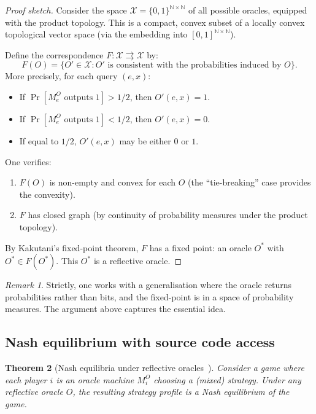 \documentclass[11pt,a4paper]{article}
\newtheorem{theorem}{Theorem}[section]
\theoremstyle{definition}
\theoremstyle{remark}
\newtheorem{remark}[theorem]{Remark}
\newcommand{\N}{\mathbb{N}}
\begin{document}
\begin{proof}[Proof sketch]
Consider the space $\mathcal{X} = \{0,1\}^{\N \times \N}$ of all
possible oracles, equipped with the product topology.  This is a
compact, convex subset of a locally convex topological vector space
(via the embedding into $[0,1]^{\N \times \N}$).

Define the correspondence $F : \mathcal{X} \rightrightarrows \mathcal{X}$
by:
\[
  F(O) = \bigl\{ O' \in \mathcal{X} : O' \text{ is consistent with the
  probabilities induced by } O \bigr\}.
\]
More precisely, for each query $(e, x)$:
\begin{itemize}
  \item If $\Pr[M_e^O \text{ outputs } 1] > 1/2$, then $O'(e,x) = 1$.
  \item If $\Pr[M_e^O \text{ outputs } 1] < 1/2$, then $O'(e,x) = 0$.
  \item If equal to $1/2$, $O'(e,x)$ may be either $0$ or $1$.
\end{itemize}

One verifies:
\begin{enumerate}
  \item $F(O)$ is non-empty and convex for each $O$ (the ``tie-breaking''
    case provides the convexity).
  \item $F$ has closed graph (by continuity of probability measures
    under the product topology).
\end{enumerate}
By Kakutani's fixed-point theorem, $F$ has a fixed point: an oracle
$O^*$ with $O^* \in F(O^*)$.  This $O^*$ is a reflective oracle.
\end{proof}

\begin{remark}
Strictly, one works with a generalisation where the oracle returns
probabilities rather than bits, and the fixed-point is in a space of
probability measures. The argument above captures the essential idea.
\end{remark}

\subsection{Nash equilibrium with source code access}

\begin{theorem}[Nash equilibria under reflective oracles~\cite{fallenstein2015reflective}]
Consider a game where each player $i$ is an oracle machine $M_i^O$
choosing a (mixed) strategy.  Under any reflective oracle $O$, the
resulting strategy profile is a Nash equilibrium of the game.
\end{theorem}
\end{document}
